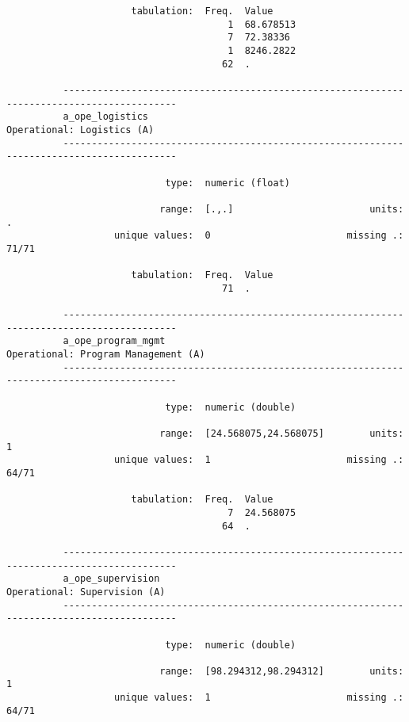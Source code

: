 \documentclass{article}
\begin{document}
\begin{verbatim}
                      tabulation:  Freq.  Value
                                       1  68.678513
                                       7  72.38336
                                       1  8246.2822
                                      62  .
          
          ------------------------------------------------------------------------------------------
          a_ope_logistics                                                 Operational: Logistics (A)
          ------------------------------------------------------------------------------------------
          
                            type:  numeric (float)
          
                           range:  [.,.]                        units:  .
                   unique values:  0                        missing .:  71/71
          
                      tabulation:  Freq.  Value
                                      71  .
          
          ------------------------------------------------------------------------------------------
          a_ope_program_mgmt                                     Operational: Program Management (A)
          ------------------------------------------------------------------------------------------
          
                            type:  numeric (double)
          
                           range:  [24.568075,24.568075]        units:  1
                   unique values:  1                        missing .:  64/71
          
                      tabulation:  Freq.  Value
                                       7  24.568075
                                      64  .
          
          ------------------------------------------------------------------------------------------
          a_ope_supervision                                             Operational: Supervision (A)
          ------------------------------------------------------------------------------------------
          
                            type:  numeric (double)
          
                           range:  [98.294312,98.294312]        units:  1
                   unique values:  1                        missing .:  64/71
          

\end{verbatim}
\end{document}
